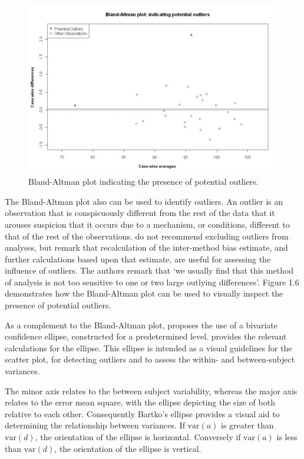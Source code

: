 \documentclass[12pt, a4paper]{report}
\theoremstyle{plain}
\theoremstyle{definition}
\theoremstyle{remark}
\begin{document}
	\begin{figure}[h!]
		\begin{center}
			\includegraphics[width=125mm]{images/BAOutliers.jpeg}
			\caption{Bland-Altman plot indicating the presence of potential outliers.}\label{Outliers}
		\end{center}
	\end{figure}
	
	\newpage
	
	
	The Bland-Altman plot also can be used to identify outliers. An
	outlier is an observation that is conspicuously different from the
	rest of the data that it arouses suspicion that it occurs due to a
	mechanism, or conditions, different to that of the rest of the
	observations. \citet*{BA99} do not recommend excluding outliers from analyses,
	but remark that recalculation of the inter-method bias estimate,
	and further calculations based upon that estimate, are useful for
	assessing the influence of outliers. The authors remark that `we
	usually find that this method of analysis is not too sensitive to
	one or two large outlying differences'. Figure 1.6 demonstrates how the Bland-Altman
	plot can be used to visually inspect the presence of potential
	outliers.
	
	As a complement to the Bland-Altman plot, \citet{Bartko} proposes
	the use of a bivariate confidence ellipse, constructed for a
	predetermined level. \citet{AltmanEllipse} provides the relevant calculations for the
	ellipse. This ellipse is intended as a visual
	guidelines for the scatter plot, for detecting outliers and to
	assess the within- and between-subject variances.
	
	The minor axis relates to the between subject variability, whereas
	the major axis relates to the error mean square, with the ellipse
	depicting the size of both relative to each other.
	Consequently Bartko's ellipse provides a visual aid to determining the
	relationship between variances. If $\mbox{var}(a)$ is greater than $\mbox{var}(d)$, the orientation of the ellipse is horizontal. Conversely if $\mbox{var}(a)$ is less than $\mbox{var}(d)$, the orientation of the ellipse is vertical.
	
\end{document}

